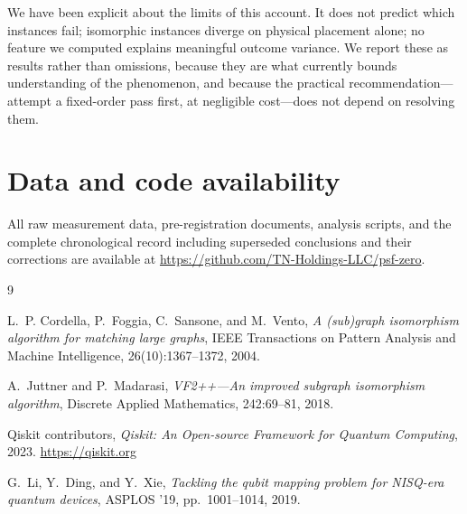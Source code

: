 \documentclass[11pt]{article}
\begin{document}
We have been explicit about the limits of this account. It does not
predict which instances fail; isomorphic instances diverge on physical
placement alone; no feature we computed explains meaningful outcome
variance. We report these as results rather than omissions, because
they are what currently bounds understanding of the phenomenon, and
because the practical recommendation---attempt a fixed-order pass first,
at negligible cost---does not depend on resolving them.

\section*{Data and code availability}

All raw measurement data, pre-registration documents, analysis scripts,
and the complete chronological record including superseded conclusions
and their corrections are available at
\url{https://github.com/TN-Holdings-LLC/psf-zero}.

\begin{thebibliography}{9}

L.~P. Cordella, P.~Foggia, C.~Sansone, and M.~Vento,
\emph{A (sub)graph isomorphism algorithm for matching large graphs},
IEEE Transactions on Pattern Analysis and Machine Intelligence,
26(10):1367--1372, 2004.

A.~Juttner and P.~Madarasi,
\emph{VF2++---An improved subgraph isomorphism algorithm},
Discrete Applied Mathematics, 242:69--81, 2018.

Qiskit contributors,
\emph{Qiskit: An Open-source Framework for Quantum Computing},
2023. \url{https://qiskit.org}

G.~Li, Y.~Ding, and Y.~Xie,
\emph{Tackling the qubit mapping problem for NISQ-era quantum devices},
ASPLOS '19, pp.~1001--1014, 2019.

\end{thebibliography}
\end{document}
